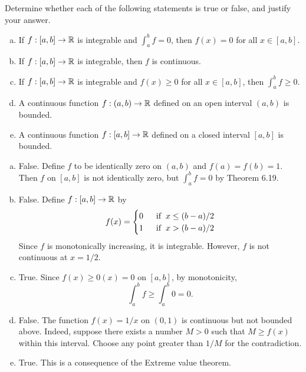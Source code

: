 \documentclass[letterpaper, twoside, 12pt]{book}
\begin{document}
\begin{exercise}[1]
  Determine whether each of the following statements is true or false, and
  justify your answer.
  \begin{enumerate}[(a)]
    \item If \(f:[a,b]\to\mathbb R\) is integrable and \(\int_a^b f=0\), then
      \(f(x)=0\) for all \(x\in[a,b]\).
    \item If \(f:[a,b]\to\mathbb R\) is integrable, then \(f\) is continuous.
    \item If \(f:[a,b]\to\mathbb R\) is integrable and \(f(x)\geq0\) for all
      \(x\in[a,b]\), then \(\int_a^b f\geq 0\).
    \item A continuous function \(f:(a,b)\to\mathbb R\) defined on an open interval
      \((a,b)\) is bounded.
    \item A continuous function \(f:[a,b]\to\mathbb R\) defined on a closed interval
      \([a,b]\) is bounded.
  \end{enumerate}
\end{exercise}
\begin{solution}
  \begin{enumerate}[(a)]
    \item False. Define \(f\) to be identically zero on \((a,b)\) and
          \(f(a) = f(b) = 1\). Then \(f\) on \([a,b]\) is not identically zero,
          but \(\int_a^b f = 0\) by Theorem 6.19.
    \item False. Define \(f: [a, b] \rightarrow \mathbb R\) by
         \[ f(x) = \begin{cases} 
                 0 &\hspace{2mm} \text{if} \hspace{2mm} x \leq (b - a)/2 \\
                 1 &\hspace{2mm} \text{if} \hspace{2mm} x > (b - a)/2 \\
             \end{cases} \]
         Since \(f\) is monotonically increasing, it is integrable. However,
         \(f\) is not continuous at \(x = 1/2\).
    \item True. Since \(f(x) \geq 0(x) = 0\) on \([a,b]\), by monotonicity,
        \[ \int_a^b f \geq \int_a^b 0 = 0 .\]
    \item False. The function \(f(x) = 1/x\) on \((0,1)\) is continuous but
        not bounded above. Indeed, suppose there exists a number \(M > 0\)
        such that \(M \geq f(x)\) within this interval. Choose any point
        greater than \(1 / M\) for the contradiction.
    \item True. This is a consequence of the Extreme value theorem.
  \end{enumerate}
\end{solution}
\end{document}
